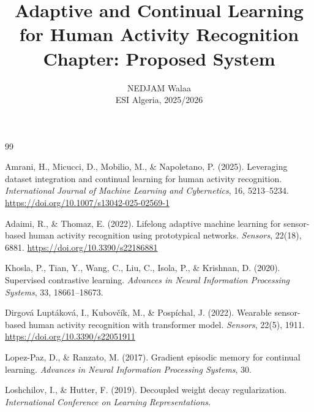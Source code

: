 \documentclass[12pt, a4paper]{report}
\title{\textbf{Adaptive and Continual Learning\\
       for Human Activity Recognition}\\[0.8em]
       \large Chapter: Proposed System}
\author{NEDJAM Walaa \\ ESI Algeria, 2025/2026}
\date{}
\begin{document}
\maketitle
\tableofcontents
\newpage




\begin{thebibliography}{99}

Amrani, H., Micucci, D., Mobilio, M., \& Napoletano, P. (2025).
Leveraging dataset integration and continual learning for human activity
recognition.
\textit{International Journal of Machine Learning and Cybernetics}, 16,
5213--5234.
\url{https://doi.org/10.1007/s13042-025-02569-1}

Adaimi, R., \& Thomaz, E. (2022).
Lifelong adaptive machine learning for sensor-based human activity
recognition using prototypical networks.
\textit{Sensors}, 22(18), 6881.
\url{https://doi.org/10.3390/s22186881}

Khosla, P., Tian, Y., Wang, C., Liu, C., Isola, P., \& Krishnan, D. (2020).
Supervised contrastive learning.
\textit{Advances in Neural Information Processing Systems}, 33,
18661--18673.

Dirgov\'{a} Lupt\'{a}kov\'{a}, I., Kubov\v{c}\'{i}k, M., \&
Posp\'{i}chal, J. (2022).
Wearable sensor-based human activity recognition with transformer model.
\textit{Sensors}, 22(5), 1911.
\url{https://doi.org/10.3390/s22051911}

Lopez-Paz, D., \& Ranzato, M. (2017).
Gradient episodic memory for continual learning.
\textit{Advances in Neural Information Processing Systems}, 30.

Loshchilov, I., \& Hutter, F. (2019).
Decoupled weight decay regularization.
\textit{International Conference on Learning Representations}.

\end{thebibliography}
\end{document}
